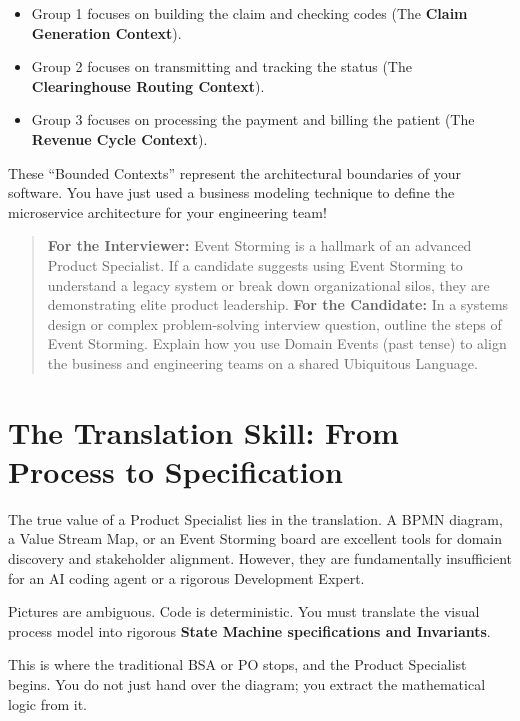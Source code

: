 \begin{itemize}
\tightlist
\item
  Group 1 focuses on building the claim and checking codes (The
  \textbf{Claim Generation Context}).
\item
  Group 2 focuses on transmitting and tracking the status (The
  \textbf{Clearinghouse Routing Context}).
\item
  Group 3 focuses on processing the payment and billing the patient (The
  \textbf{Revenue Cycle Context}).
\end{itemize}

These ``Bounded Contexts'' represent the architectural boundaries of
your software. You have just used a business modeling technique to
define the microservice architecture for your engineering team!

\begin{quote}
\textbf{For the Interviewer:} Event Storming is a hallmark of an
advanced Product Specialist. If a candidate suggests using Event
Storming to understand a legacy system or break down organizational
silos, they are demonstrating elite product leadership. \textbf{For the
Candidate:} In a systems design or complex problem-solving interview
question, outline the steps of Event Storming. Explain how you use
Domain Events (past tense) to align the business and engineering teams
on a shared Ubiquitous Language.
\end{quote}

\bigskip

\section{The Translation Skill: From Process to
Specification}\label{the-translation-skill-from-process-to-specification}

The true value of a Product Specialist lies in the translation. A BPMN
diagram, a Value Stream Map, or an Event Storming board are excellent
tools for domain discovery and stakeholder alignment. However, they are
fundamentally insufficient for an AI coding agent or a rigorous
Development Expert.

Pictures are ambiguous. Code is deterministic. You must translate the
visual process model into rigorous \textbf{State Machine specifications
and Invariants}.

This is where the traditional BSA or PO stops, and the Product
Specialist begins. You do not just hand over the diagram; you extract
the mathematical logic from it.

